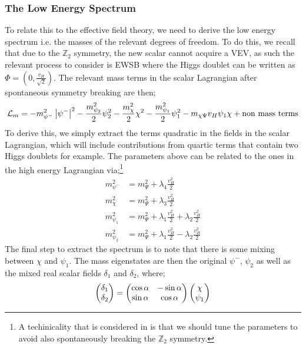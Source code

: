 \documentclass[10pt]{article}
\begin{document}
\subsubsection{The Low Energy Spectrum}
To relate this to the effective field theory, we need to derive the low energy spectrum i.e. the masses of the relevant degrees of freedom. To do this, we recall that due to the $\mathbb{Z}_2$ symmetry, the new scalar cannot acquire a VEV, as such the relevant process to consider is EWSB where the Higgs doublet can be written as $\Phi = (0, \tfrac{v_H}{\sqrt{2}})$. The relevant mass terms in the scalar Lagrangian after spontaneous symmetry breaking are then;
\begin{dmath}
  \mL_m = -m_{\psi^-}^2 \Abs{\psi^-}^2 - \frac{m_{\psi_2}^2}{2}\psi_2^2 - \frac{m_\chi^2}{2}\chi^2 - \frac{m_{\psi_1}^2}{2}\psi_1^2 - m_{\chi\Psi}v_H \psi_1 \chi + \text{non mass terms}
\end{dmath}
To derive this, we simply extract the terms quadratic in the fields in the scalar Lagrangian, which will include contributions from quartic terms that contain two Higgs doublets for example. The parameters above can be related to the ones in the high energy Lagrangian via;\footnote{A techinicality that is considered in \cite{Farzan2009} is that we should tune the parameters to avoid also spontaneously breaking the $\mathbb{Z}_2$ symmetry.}
\begin{align}
  m_{\psi^-}^2 &= m_{\Psi}^2 + \lambda_4 \frac{v_H^2}{2} \\
  m_\chi^2 &= m_{\Psi}^2 + \lambda_3 \frac{v_H^2}{2} \\
  m_{\psi_1}^2 &= m_{\Psi}^2 + \lambda_1 \frac{v_H^2}{2} + \lambda_2 \frac{v_H^2}{2} \\
  m_{\psi_2}^2 &= m_{\Psi}^2 + \lambda_1 \frac{v_H^2}{2} - \lambda_2 \frac{v_H^2}{2}
\end{align}
The final step to extract the spectrum is to note that there is some mixing between $\chi$ and $\psi_1$. The mass eigenstates are then the original $\psi^-$, $\psi_2$ as well as the mixed real scalar fields $\delta_1$ and $\delta_2$, where;
\begin{equation}
\begin{pmatrix}\delta_1\\\delta_2\end{pmatrix} = \begin{pmatrix}\cos \alpha&-\sin\alpha \\ \sin\alpha&\cos\alpha \end{pmatrix} \begin{pmatrix}\chi\\\psi_1\end{pmatrix}
\end{equation}
\end{document}
